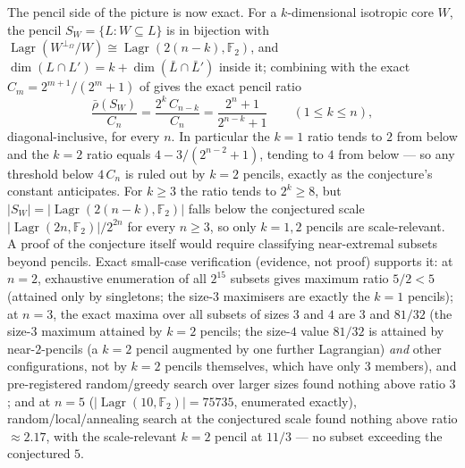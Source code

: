 \documentclass[11pt,a4paper]{article}
\theoremstyle{plain}
\theoremstyle{definition}
\newcommand{\F}{\mathbb{F}}
\DeclareMathOperator{\Lagr}{Lagr}
\begin{document}
The pencil side of the picture is now exact. For a $k$-dimensional isotropic core $W$, the pencil $S_W = \{L : W \subseteq L\}$ is in bijection with $\Lagr(W^{\perp_\Omega}/W) \cong \Lagr(2(n-k),\F_2)$, and $\dim(L \cap L') = k + \dim(\bar L \cap \bar L')$ inside it; combining with the exact $C_m = 2^{m+1}/(2^m+1)$ of  gives the exact pencil ratio
\[
\frac{\bar\rho(S_W)}{C_n} = \frac{2^k\,C_{n-k}}{C_n} = \frac{2^n+1}{2^{n-k}+1}
\qquad (1 \le k \le n),
\]
diagonal-inclusive, for every $n$. In particular the $k=1$ ratio tends to $2$ from below and the $k=2$ ratio equals $4 - 3/(2^{n-2}+1)$, tending to $4$ from below --- so any threshold below $4\,C_n$ is ruled out by $k=2$ pencils, exactly as the conjecture's constant anticipates. For $k \ge 3$ the ratio tends to $2^k \ge 8$, but $|S_W| = |\Lagr(2(n-k),\F_2)|$ falls below the conjectured scale $|\Lagr(2n,\F_2)|/2^{2n}$ for every $n \ge 3$, so only $k = 1, 2$ pencils are scale-relevant. A proof of the conjecture itself would require classifying near-extremal subsets beyond pencils. Exact small-case verification (evidence, not proof) supports it: at $n=2$, exhaustive enumeration of all $2^{15}$ subsets gives maximum ratio $5/2 < 5$ (attained only by singletons; the size-$3$ maximisers are exactly the $k=1$ pencils); at $n=3$, the exact maxima over all subsets of sizes $3$ and $4$ are $3$ and $81/32$ (the size-$3$ maximum attained by $k=2$ pencils; the size-$4$ value $81/32$ is attained by near-$2$-pencils (a $k=2$ pencil augmented by one further Lagrangian) \emph{and} other configurations, not by $k=2$ pencils themselves, which have only $3$ members), and pre-registered random/greedy search over larger sizes found nothing above ratio $3$; and at $n=5$ ($|\Lagr(10,\F_2)|=75735$, enumerated exactly), random/local/annealing search at the conjectured scale found nothing above ratio $\approx 2.17$, with the scale-relevant $k=2$ pencil at $11/3$ --- no subset exceeding the conjectured $5$.
\end{document}
